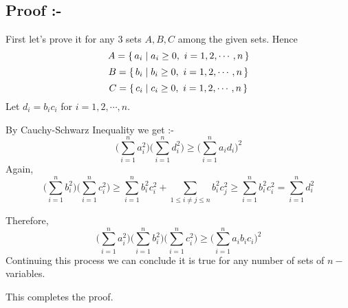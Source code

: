 \documentclass[12pt]{article}
\begin{document}
	\pagebreak 


\subsection{Proof :-}
\Large{First let's prove it for any 3 sets $A,B,C$ among the given sets. Hence \[A=\set{a_i\mid a_i\geq0,\ i=1,2,\cdots,n} \] \[B=\set{b_i\mid b_i\geq0,\ i=1,2,\cdots,n} \]\[C=\set{c_i\mid c_i\geq0,\ i=1,2,\cdots,n} \] Let $d_i=b_ic_i$ for $i=1,2,\cdots,n$.


By Cauchy-Schwarz Inequality we get :-\[\Bigg(\sum_{i=1}^na_i^2\Bigg)\Bigg(\sum_{i=1}^nd_i^2\Bigg)\geq \Bigg(\sum_{i=1}^na_id_i\Bigg)^2\]Again, \[\Bigg(\sum_{i=1}^nb_i^2\Bigg)\Bigg(\sum_{i=1}^nc_i^2\Bigg)\geq \sum_{i=1}^nb_i^2c_i^2+\sum_{1\leq i\neq  j\leq n}b_i^2c_j^2\geq\sum_{i=1}^nb_i^2c_i^2= \sum_{i=1}^nd_i^2\]}Therefore, \[\Bigg(\sum_{i=1}^na_i^2\Bigg)\Bigg(\sum_{i=1}^nb_i^2\Bigg)\Bigg(\sum_{i=1}^nc_i^2\Bigg)\geq\Bigg(\sum_{i=1}^na_ib_ic_i\Bigg)^2 \]Continuing this process we can conclude it is true for any number of sets of $n-$variables.

This completes the proof.
\end{document}
